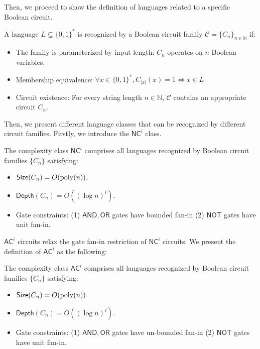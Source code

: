 Then, we proceed to show the definition of languages related to a specific Boolean circuit.

\begin{definition}
A language $L \subseteq \{0, 1\}^*$ is recognized by a Boolean circuit family $\mathcal{C} = \{C_n\}_{n \in \mathbb{N}}$ if:
\begin{itemize}
    \item The family is parameterized by input length: $C_n$ operates on $n$ Boolean variables.
    \item Membership equivalence: $\forall x \in \{0,1\}^*, C_{|x|}(x) = 1\Longleftrightarrow x \in L$.
    \item Circuit existence: For every string length $n \in \mathbb{N}$, $\mathcal{C}$ contains an appropriate circuit $C_n$.
\end{itemize}
\end{definition}

Then, we present different language classes that can be recognized by different circuit families. Firstly, we introduce the $\mathsf{NC}^i$ class.
\begin{definition}
    The complexity class $\mathsf{NC}^i$ comprises all languages recognized by Boolean circuit families $\{C_n\}$ satisfying:
    \begin{itemize}
        \item $\mathsf{Size}(C_n) = O(\operatorname{poly}(n))$.
        \item $\mathsf{Depth}(C_n) = O((\log n)^i)$.
        \item Gate constraints: (1) $\mathsf{AND}, \mathsf{OR}$ gates have bounded fan-in (2) $\mathsf{NOT}$ gates have unit fan-in.
    \end{itemize}
\end{definition}

$\mathsf{AC}^i$ circuits relax the gate fan-in restriction of $\mathsf{NC}^i$ circuits. We present the definition of $\mathsf{AC}^i$ as the following:
\begin{definition}
    The complexity class $\mathsf{AC}^i$ comprises all languages recognized by Boolean circuit families $\{C_n\}$ satisfying:
    \begin{itemize}
        \item $\mathsf{Size}(C_n) = O(\operatorname{poly}(n))$.
        \item $\mathsf{Depth}(C_n) = O((\log n)^i)$.
        \item Gate constraints: (1) $\mathsf{AND}, \mathsf{OR}$ gates have un-bounded fan-in (2) $\mathsf{NOT}$ gates have unit fan-in.
    \end{itemize}
\end{definition}

